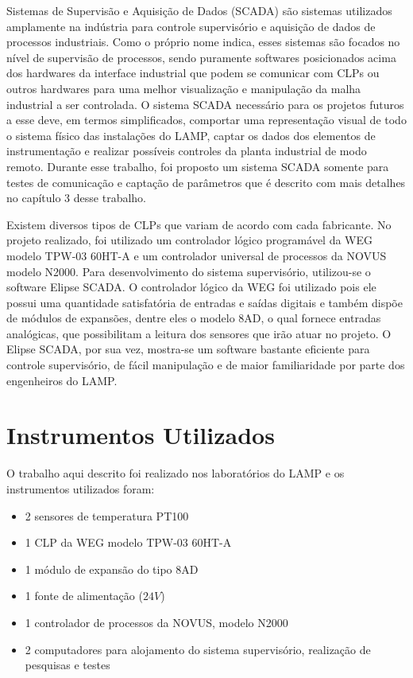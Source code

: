 Sistemas de Supervisão e Aquisição de Dados (SCADA) são sistemas utilizados amplamente na indústria para controle supervisório e aquisição de dados de processos industriais. Como o próprio nome indica, esses sistemas são focados no nível de supervisão de processos, sendo puramente softwares posicionados acima dos hardwares da interface industrial que podem se comunicar com CLPs ou outros hardwares \cite{daneels1999scada} para uma melhor visualização e manipulação da malha industrial a ser controlada. O sistema SCADA necessário para os projetos futuros a esse deve, em termos simplificados, comportar uma representação visual de todo o sistema físico das instalações do LAMP, captar os dados dos elementos de instrumentação e realizar possíveis controles da planta industrial de modo remoto. Durante esse trabalho, foi proposto um sistema SCADA somente para testes de comunicação e captação de parâmetros que é descrito com mais detalhes no capítulo 3 desse trabalho.

Existem diversos tipos de CLPs que variam de acordo com cada fabricante. No projeto realizado, foi utilizado um controlador lógico programável da WEG modelo TPW-03 60HT-A e um controlador universal de processos da NOVUS modelo N2000. Para desenvolvimento do sistema supervisório, utilizou-se o software Elipse SCADA. O controlador lógico da WEG foi utilizado pois ele possui uma quantidade satisfatória de entradas e saídas digitais e também dispõe de módulos de expansões, dentre eles o modelo 8AD, o qual fornece entradas analógicas, que possibilitam a leitura dos sensores que irão atuar no projeto. O Elipse SCADA, por sua vez, mostra-se um software bastante eficiente para controle supervisório, de fácil manipulação e de maior familiaridade por parte dos engenheiros do LAMP.

\section{Instrumentos Utilizados}

O trabalho aqui descrito foi realizado nos laboratórios do LAMP e os instrumentos utilizados foram:

\begin{itemize}
    \item 2 sensores de temperatura PT100
    \item 1 CLP da WEG modelo TPW-03 60HT-A
    \item 1 módulo de expansão do tipo 8AD 
    \item 1 fonte de alimentação ($24V$)
    \item 1 controlador de processos da NOVUS, modelo N2000
    \item 2 computadores para alojamento do sistema supervisório, realização de pesquisas e testes
\end{itemize}


